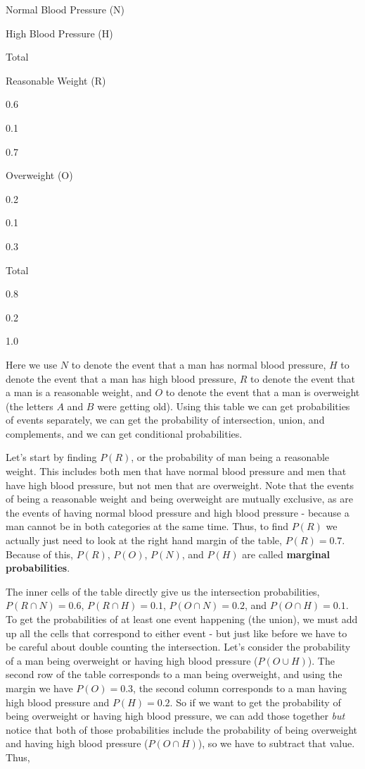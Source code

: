 \documentclass[
]{book}
\theoremstyle{definition}
\theoremstyle{definition}
\theoremstyle{definition}
\theoremstyle{remark}
\begin{document}
Normal Blood Pressure (N)

High Blood Pressure (H)

Total

Reasonable Weight (R)

0.6

0.1

0.7

Overweight (O)

0.2

0.1

0.3

Total

0.8

0.2

1.0

Here we use \(N\) to denote the event that a man has normal blood pressure, \(H\) to denote the event that a man has high blood pressure, \(R\) to denote the event that a man is a reasonable weight, and \(O\) to denote the event that a man is overweight (the letters \(A\) and \(B\) were getting old). Using this table we can get probabilities of events separately, we can get the probability of intersection, union, and complements, and we can get conditional probabilities.

Let's start by finding \(P(R)\), or the probability of man being a reasonable weight. This includes both men that have normal blood pressure and men that have high blood pressure, but not men that are overweight. Note that the events of being a reasonable weight and being overweight are mutually exclusive, as are the events of having normal blood pressure and high blood pressure - because a man cannot be in both categories at the same time. Thus, to find \(P(R)\) we actually just need to look at the right hand margin of the table, \(P(R) = 0.7\). Because of this, \(P(R)\), \(P(O)\), \(P(N)\), and \(P(H)\) are called \textbf{marginal probabilities}.

The inner cells of the table directly give us the intersection probabilities, \(P(R \cap N) = 0.6\), \(P(R \cap H) = 0.1\), \(P(O \cap N)=0.2\), and \(P(O \cap H)=0.1\). To get the probabilities of at least one event happening (the union), we must add up all the cells that correspond to either event - but just like before we have to be careful about double counting the intersection. Let's consider the probability of a man being overweight or having high blood pressure (\(P(O \cup H)\)). The second row of the table corresponds to a man being overweight, and using the margin we have \(P(O) = 0.3\), the second column corresponds to a man having high blood pressure and \(P(H) = 0.2\). So if we want to get the probability of being overweight or having high blood pressure, we can add those together \emph{but} notice that both of those probabilities include the probability of being overweight and having high blood pressure (\(P(O \cap H)\)), so we have to subtract that value. Thus,
\end{document}
